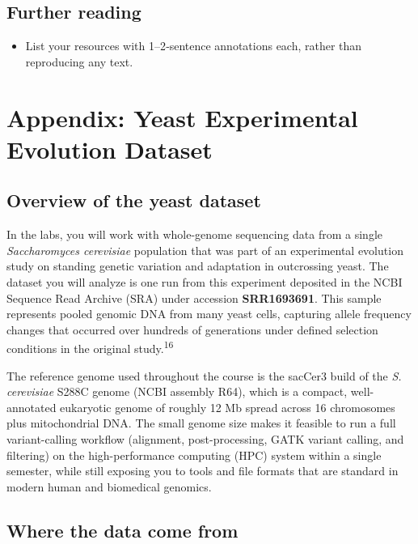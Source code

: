 \documentclass[
  letterpaper,
  DIV=11,
  numbers=noendperiod]{scrreprt}
\providecommand{\tightlist}{%
  \setlength{\itemsep}{0pt}\setlength{\parskip}{0pt}}
\begin{document}
\section{Further reading}\label{further-reading-9}

\begin{itemize}
\tightlist
\item
  List your resources with 1--2‑sentence annotations each, rather than
  reproducing any text.
\end{itemize}

\cleardoublepage
{}
{}
\appendix

\chapter{Appendix: Yeast Experimental Evolution
Dataset}\label{appendix-yeast-experimental-evolution-dataset}

\section{Overview of the yeast dataset}\label{sec-yeast}

In the labs, you will work with whole-genome sequencing data from a
single \emph{Saccharomyces cerevisiae} population that was part of an
experimental evolution study on standing genetic variation and
adaptation in outcrossing yeast. The dataset you will analyze is one run
from this experiment deposited in the NCBI Sequence Read Archive (SRA)
under accession \textbf{SRR1693691}. This sample represents pooled
genomic DNA from many yeast cells, capturing allele frequency changes
that occurred over hundreds of generations under defined selection
conditions in the original study.\textsuperscript{16}

The reference genome used throughout the course is the sacCer3 build of
the \emph{S. cerevisiae} S288C genome (NCBI assembly R64), which is a
compact, well-annotated eukaryotic genome of roughly 12 Mb spread across
16 chromosomes plus mitochondrial DNA. The small genome size makes it
feasible to run a full variant-calling workflow (alignment,
post-processing, GATK variant calling, and filtering) on the
high-performance computing (HPC) system within a single semester, while
still exposing you to tools and file formats that are standard in modern
human and biomedical genomics.

\section{Where the data come from}\label{where-the-data-come-from}
\end{document}
